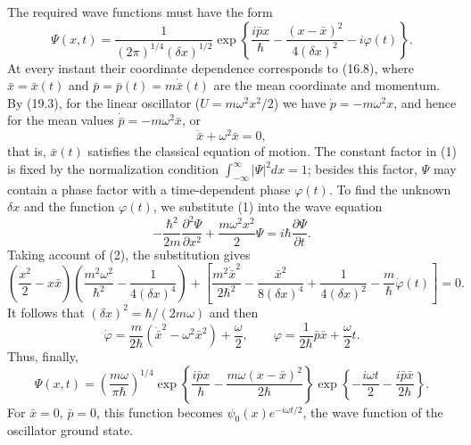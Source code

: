 \SolutionHeading
The required wave functions must have the form
\begin{equation}
  \Psi(x,t)=\frac{1}{(2\pi)^{1/4}(\delta x)^{1/2}}
  \exp\left\{\frac{i\bar p x}{\hbar}
  -\frac{(x-\bar x)^2}{4(\delta x)^2}-i\varphi(t)\right\}.
  \tag{1}
\end{equation}
At every instant their coordinate dependence corresponds to (16.8), where
$\bar x=\bar x(t)$ and $\bar p=\bar p(t)=m\dot{\bar x}(t)$ are the mean
coordinate and momentum. By (19.3), for the linear oscillator
($U=m\omega^2x^2/2$) we have $\dot p=-m\omega^2x$, and hence for the mean
values $\dot{\bar p}=-m\omega^2\bar x$, or
\begin{equation}
  \ddot{\bar x}+\omega^2\bar x=0,
  \tag{2}
\end{equation}
that is, $\bar x(t)$ satisfies the classical equation of motion. The constant
factor in (1) is fixed by the normalization condition
$\int_{-\infty}^{\infty}|\Psi|^2dx=1$; besides this factor, $\Psi$ may contain
a phase factor with a time-dependent phase $\varphi(t)$. To find the unknown
$\delta x$ and the function $\varphi(t)$, we substitute (1) into
the wave equation
\[
  -\frac{\hbar^2}{2m}\frac{\partial^2\Psi}{\partial x^2}
  +\frac{m\omega^2x^2}{2}\Psi=i\hbar\frac{\partial\Psi}{\partial t}.
\]
Taking account of (2), the substitution gives
\[
  \left(\frac{x^2}{2}-x\bar x\right)
  \left(\frac{m^2\omega^2}{\hbar^2}-\frac1{4(\delta x)^4}\right)
  +\left[\frac{m^2\dot{\bar x}^{2}}{2\hbar^2}
  -\frac{\bar x^2}{8(\delta x)^4}+\frac1{4(\delta x)^2}
  -\frac m\hbar\dot\varphi(t)\right]=0.
\]
It follows that $(\delta x)^2=\hbar/(2m\omega)$ and then
\[
  \dot\varphi=\frac m{2\hbar}(\dot{\bar x}^{2}-\omega^2\bar x^2)
  +\frac\omega2,
  \qquad
  \varphi=\frac1{2\hbar}\bar p\bar x+\frac\omega2t.
\]
Thus, finally,
\begin{equation}
  \Psi(x,t)=\left(\frac{m\omega}{\pi\hbar}\right)^{1/4}
  \exp\left\{\frac{i\bar p x}{\hbar}
  -\frac{m\omega(x-\bar x)^2}{2\hbar}\right\}
  \exp\left\{-\frac{i\omega t}{2}-\frac{i\bar p\bar x}{2\hbar}\right\}.
  \tag{3}
\end{equation}
For $\bar x=0$, $\bar p=0$, this function becomes
$\psi_0(x)e^{-i\omega t/2}$, the wave function of the oscillator ground state.

